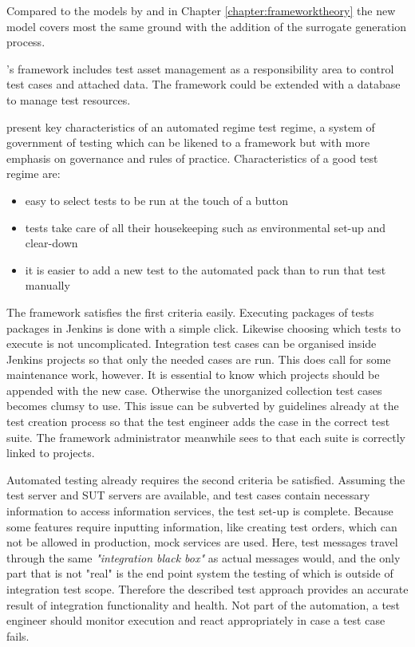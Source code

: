 \documentclass[12pt,a4paper,oneside,pdftex]{report}
\begin{document}
{Compared to the models by \citet{liu2009unified} and \citet{huang2008surrogate} in Chapter \ref{chapter:frameworktheory} the new model covers most the same ground with the addition of the surrogate generation process. 

\citeauthor{laukkanen2006data}'s \citeyearpar{laukkanen2006data} framework includes test asset management as a responsibility area to control test cases and attached data. The framework could be extended with a database to manage test resources.

\citet{fewster1999software} present key characteristics of an automated regime test regime, a system of government of testing which can be likened to a framework but with more emphasis on governance and rules of practice. Characteristics of a good test regime are:
\begin{itemize}
\item easy to select tests to be run at the touch of a button
\item tests take care of all their housekeeping such as environmental set-up and clear-down
\item it is easier to add a new test to the automated pack than to run that test manually
\end{itemize}

The framework satisfies the first criteria easily. Executing packages of tests packages in Jenkins is done with a simple click. Likewise choosing which tests to execute is not uncomplicated. Integration test cases can be organised inside Jenkins projects so that only the needed cases are run. This does call for some maintenance work, however. It is essential to know which projects should be appended with the new case. Otherwise the unorganized collection test cases becomes clumsy to use. This issue can be subverted by guidelines already at the test creation process so that the test engineer adds the case in the correct test suite. The framework administrator meanwhile sees to that each suite is correctly linked to projects.

Automated testing already requires the second criteria be satisfied. Assuming the test server and SUT servers are available, and test cases contain necessary information to access information services, the test set-up is complete. Because some features require inputting information, like creating test orders, which can not be allowed in production, mock services are used. Here, test messages travel through the same \emph{"integration black box"} as actual messages would, and the only part that is not "real" is the end point system the testing of which is outside of integration test scope. Therefore the described test approach provides an accurate result of integration functionality and health. Not part of the automation, a test engineer should monitor execution and react appropriately in case a test case fails.

}
\end{document}
